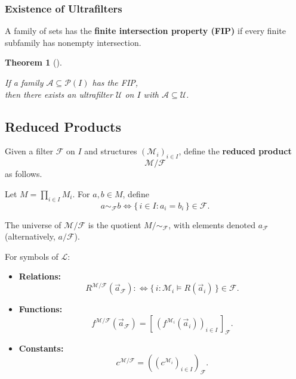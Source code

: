 \documentclass[
]{article}
\theoremstyle{definition}
\theoremstyle{plain}
\newtheorem{theorem}{Theorem}[section]
\theoremstyle{plain}
\theoremstyle{remark}
\begin{document}
\subsubsection{Existence of
Ultrafilters}\label{existence-of-ultrafilters}

A family of sets has the \textbf{finite intersection property (FIP)} if
every finite subfamily has nonempty intersection.

\begin{theorem}[]\protect\hypertarget{thm-uf-existence}{}\label{thm-uf-existence}

\hfill\break
If a family \(\mathcal{A} \subseteq \mathcal{P}(I)\) has the FIP,\\
then there exists an ultrafilter \(\mathcal{U}\) on \(I\) with
\(\mathcal{A} \subseteq \mathcal{U}\).

\end{theorem}

\subsection{Reduced Products}\label{reduced-products}

Given a filter \(\mathcal{F}\) on \(I\) and structures
\((\mathcal{M}_i)_{i \in I}\), define the \textbf{reduced product} \[
\mathcal{M} / \mathcal{F}
\] as follows.

Let \(M = \prod_{i \in I} M_i\). For \(a,b \in M\), define \[
a \sim_{\mathcal{F}} b \iff \{\, i \in I : a_i = b_i \,\} \in \mathcal{F}.
\]

The universe of \(\mathcal{M}/\mathcal{F}\) is the quotient
\(M / {\sim_{\mathcal{F}}}\), with elements denoted \(a_{\mathcal{F}}\)
(alternatively, \(a/\mathcal{F}\)).

For symbols of \(\mathcal{L}\):

\begin{itemize}
\item
  \textbf{Relations:}\\
  \[
  R^{\mathcal{M}/\mathcal{F}}(\vec a_{\mathcal{F}})
   : \iff  \{\, i : \mathcal{M}_i \models R(\vec a_i) \,\} \in \mathcal{F}.
  \]
\item
  \textbf{Functions:}\\
  \[
  f^{\mathcal{M}/\mathcal{F}}(\vec a_{\mathcal{F}}) =
  [\, (f^{\mathcal{M}_i}(\vec a_i))_{i \in I} \,]_{\mathcal{F}}.
  \]
\item
  \textbf{Constants:}\\
  \[
  c^{\mathcal{M}/\mathcal{F}} = ((c^{\mathcal{M}_i})_{i\in I})_{\mathcal{F}}.
  \]
\end{itemize}
\end{document}
